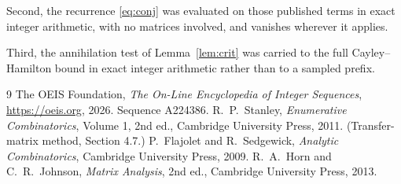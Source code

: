 \documentclass[11pt,a4paper]{article}
\theoremstyle{plain}
\theoremstyle{definition}
\begin{document}
Second, the recurrence \eqref{eq:conj} was evaluated on those published terms in exact
integer arithmetic, with no matrices involved, and vanishes wherever it applies.

Third, the annihilation test of Lemma~\ref{lem:crit} was carried to the full
Cayley--Hamilton bound in exact integer arithmetic rather than to a sampled prefix.

\begin{thebibliography}{9}
 The OEIS Foundation, \emph{The On-Line Encyclopedia of Integer
Sequences}, \url{https://oeis.org}, 2026. Sequence A224386.
 R.~P.~Stanley, \emph{Enumerative Combinatorics}, Volume 1, 2nd ed.,
Cambridge University Press, 2011. (Transfer-matrix method, Section 4.7.)
 P.~Flajolet and R.~Sedgewick, \emph{Analytic Combinatorics}, Cambridge
University Press, 2009.
 R.~A.~Horn and C.~R.~Johnson, \emph{Matrix Analysis}, 2nd ed., Cambridge
University Press, 2013.
\end{thebibliography}
\end{document}
